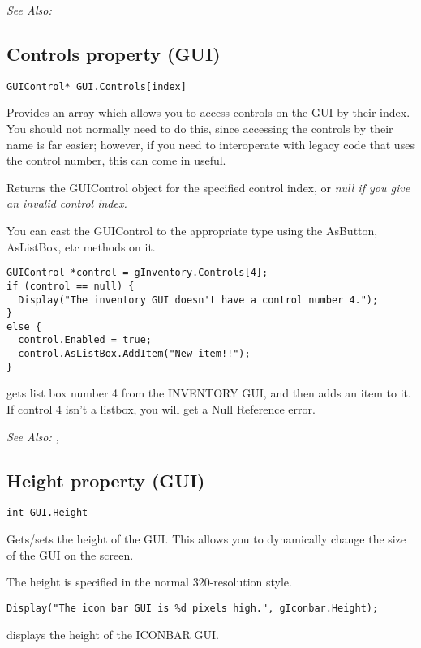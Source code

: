\it{See Also:} 


\subsection{Controls property (GUI)}\label{GUI.Controls}%

\begin{verbatim}
GUIControl* GUI.Controls[index]
\end{verbatim}
Provides an array which allows you to access controls on the GUI by their index. You should
not normally need to do this, since accessing the controls by their name is far easier;
however, if you need to interoperate with legacy code that uses the control number, this
can come in useful.

Returns the GUIControl object for the specified control index, or \it{null} if you
give an invalid control index.

You can cast the GUIControl to the appropriate type using the AsButton, AsListBox, etc
methods on it.

\begin{verbatim}
GUIControl *control = gInventory.Controls[4];
if (control == null) {
  Display("The inventory GUI doesn't have a control number 4.");
}
else {
  control.Enabled = true;
  control.AsListBox.AddItem("New item!!");
}
\end{verbatim}
gets list box number 4 from the INVENTORY GUI, and then adds an item to it.
If control 4 isn't a listbox, you will get a Null Reference error.

\it{See Also:} ,


\subsection{Height property (GUI)}\label{GUI.Height}%

\begin{verbatim}
int GUI.Height
\end{verbatim}
Gets/sets the height of the GUI. This allows you to dynamically change the size
of the GUI on the screen.

The height is specified in the normal 320-resolution style.

\begin{verbatim}
Display("The icon bar GUI is %d pixels high.", gIconbar.Height);
\end{verbatim}
displays the height of the ICONBAR GUI.

